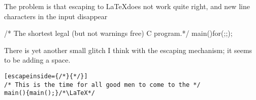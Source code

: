 \documentclass{article}
\begin{document}
The problem is that escaping to \LaTeX does not work quite right, and new line
characters in the input disappear
\begin{code}
/* The shortest legal (but not warnings free) C 
program.*/ 
main(){for(;;);}
\end{code}
There is yet another small glitch I think with the escaping mechanism; it seems to 
be adding a space.
\begin{LTXexample}
\begin{lstlisting}[escapeinside={/*}{*/}]
/* This is the time for all good men to come to the */
main(){main();}/*\LaTeX*/
\end{lstlisting}
\end{LTXexample}
\end{document}
